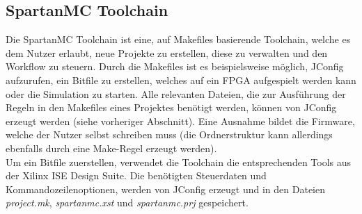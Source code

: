 \subsection{SpartanMC Toolchain}
Die SpartanMC Toolchain ist eine, auf Makefiles basierende Toolchain, welche es dem Nutzer erlaubt, neue Projekte zu erstellen, diese zu
verwalten und den Workflow zu steuern. Durch die Makefiles ist es beispielsweise möglich, JConfig aufzurufen, ein Bitfile zu erstellen, welches
auf ein FPGA aufgespielt werden kann oder die Simulation zu starten. Alle relevanten Dateien, die zur Ausführung der Regeln in den Makefiles eines Projektes benötigt 
werden, können von JConfig erzeugt werden (siehe vorheriger Abschnitt). Eine Ausnahme bildet die Firmware, welche der Nutzer selbst schreiben muss (die
Ordnerstruktur kann allerdings ebenfalls durch eine Make-Regel erzeugt werden).\\
Um ein Bitfile zuerstellen, verwendet die Toolchain die entsprechenden Tools aus der Xilinx ISE Design Suite. Die benötigten Steuerdaten und Kommandozeilenoptionen,
werden von JConfig erzeugt und in den Dateien \textit{project.mk}, \textit{spartanmc.xst} und \textit{spartanmc.prj} gespeichert.

